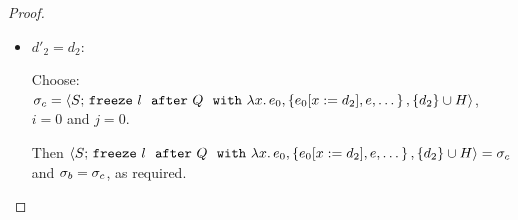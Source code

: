 \begin{proof}
\begin{itemize}
\begin{itemize}
\begin{itemize}
\begin{enumerate}
            Hence $\conf_a \parstepsto \conf_c$.

          \item $\conf_b \parstepsto \conf_c$, where \\
            $\conf_b = \config{S}{\freezeafterfull{l}{Q}{\lam{x}{e_0}}{\setof{\subst{e_0}{x}{d'_2},
                e, \dots}} {\{d'_2\}\cup H}}$, and \\
            $\conf_c = \config{S}{\freezeafterfull{l}{Q}{\lam{x}{e_0}}{\setof{\subst{e_0}{x}{d_2},
                  \subst{e_0}{x}{d'_2}, e, \dots}} {\{d_2, d'_2\}\cup H}}$.

            The proof is as follows:

            From the premises of {\sc E-Spawn-Handler}, \\
            $S(l) = \state{d_1}{\status_1}$ and
            $d_2 \userleq d_1$ and 
            $d_2 \notin H$ and
            $d_2 \in Q$.

            Therefore, by {\sc E-Spawn-Handler}, \\
            $\config{S}{\freezeafterfull{l}{Q}{\lam{x}{e_0}}{\setof{\subst{e_0}{x}{d'_2},
                  e, \dots}} {\{d'_2\}\cup H}} \parstepsto \\
            \config{S}{\freezeafterfull{l}{Q}{\lam{x}{e_0}}{\setof{\subst{e_0}{x}{d_2}, \subst{e_0}{x}{d'_2},
                  e, \dots}} \setof{d_2} \cup {\{d'_2\}\cup H}}$, \\
            which is equivalent to \\

            $\config{S}{\freezeafterfull{l}{Q}{\lam{x}{e_0}}{\setof{\subst{e_0}{x}{d_2},
                  \subst{e_0}{x}{d'_2}, e, \dots}} {\{d_2, d'_2\}\cup H}}$.

            Hence $\conf_b \parstepsto \conf_c$.
          \end{enumerate}

        \item $d'_2 = d_2$:

          Choose:
          $\sigma_c = \langle S;\, \mbox{\texttt{freeze}}~l~~{\mbox{\texttt{after}}}~Q~~{\mbox{\texttt{with}}}~\lambda x.\,e_0, \left\{e_0[x := d_2],
                e, \dots\right\}, \{d_2\}\cup H \rangle$, \\
          $i = 0$ and $j = 0$.

          Then
          $\langle S;\, \mbox{\texttt{freeze}}~l~~{\mbox{\texttt{after}}}~Q~~{\mbox{\texttt{with}}}~\lambda x.\,e_0, \left\{e_0[x := d_2],
                e, \dots\right\}, \{d_2\}\cup H \rangle = \sigma_c$ and $\sigma_b =
          \sigma_c$, as required.
        \end{itemize}


\end{itemize}
\end{itemize}
\end{proof}
